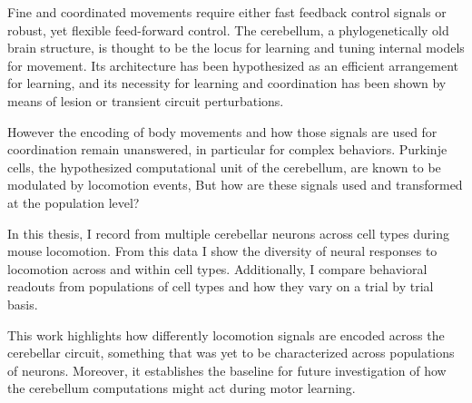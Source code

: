
%


Fine and coordinated movements require either fast feedback control signals or robust, yet flexible feed-forward control. The cerebellum, a phylogenetically old brain structure, is thought to be the locus for learning and tuning internal models for movement.
Its architecture has been hypothesized as an efficient arrangement for learning, and its necessity for learning and coordination has been shown by means of lesion or transient circuit perturbations.
\par However the encoding of body movements and how those signals are used for coordination remain unanswered, in particular for complex behaviors. Purkinje cells, the hypothesized computational unit of the cerebellum, are known to be modulated by locomotion events, But how are these signals used and transformed at the population level?
\par In this thesis, I record from multiple cerebellar neurons across cell types during mouse locomotion. From this data I show the diversity of neural responses to locomotion across and within cell types. Additionally, I compare behavioral readouts from populations of cell types and how they vary on a trial by trial basis.
\par This work highlights how differently locomotion signals are encoded across the cerebellar circuit, something that was yet to be characterized across populations of neurons. Moreover, it establishes the baseline for future investigation of how the cerebellum computations might act during motor learning.

